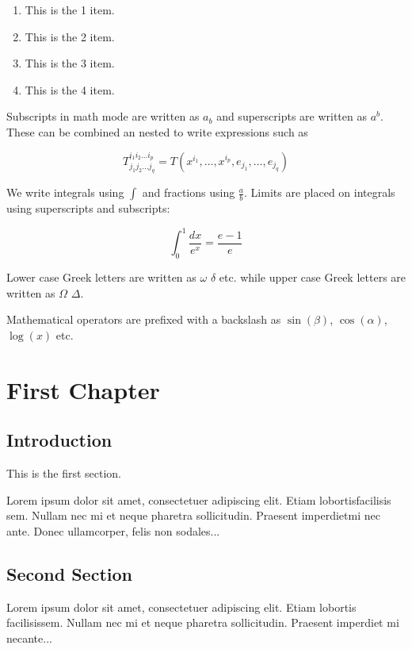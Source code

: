 \documentclass[12pt, a4paper ]{article}
\begin{document}
\begin{enumerate}
  \item This is the 1 item.
  \item This is the 2 item.
  \item This is the 3 item.
  \item This is the 4 item.
\end{enumerate}


Subscripts in math mode are written as $a_b$ and superscripts are written as $a^b$. These can be combined an nested to write expressions such as

\[ T^{i_1 i_2 \dots i_p}_{j_1 j_2 \dots j_q} = T(x^{i_1},\dots,x^{i_p},e_{j_1},\dots,e_{j_q}) \]
 
We write integrals using $\int$ and fractions using $\frac{a}{b}$. Limits are placed on integrals using superscripts and subscripts:

\[ \int_0^1 \frac{dx}{e^x} =  \frac{e-1}{e} \]

Lower case Greek letters are written as $\omega$ $\delta$ etc. while upper case Greek letters are written as $\Omega$ $\Delta$.

Mathematical operators are prefixed with a backslash as $\sin(\beta)$, $\cos(\alpha)$, $\log(x)$ etc.



\chapter{First Chapter}

\section{Introduction}

This is the first section.

Lorem  ipsum  dolor  sit  amet,  consectetuer  adipiscing  
elit.   Etiam  lobortisfacilisis sem.  Nullam nec mi et 
neque pharetra sollicitudin.  Praesent imperdietmi nec ante. 
Donec ullamcorper, felis non sodales...

\section{Second Section}

Lorem ipsum dolor sit amet, consectetuer adipiscing elit.  
Etiam lobortis facilisissem.  Nullam nec mi et neque pharetra 
sollicitudin.  Praesent imperdiet mi necante...
\end{document}
